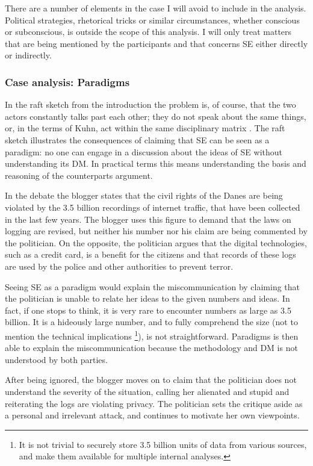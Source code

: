 \documentclass{article}
\begin{document}
There are a number of elements in the case I will avoid to include in the analysis. Political strategies, rhetorical tricks or similar circumstances, whether conscious or subconscious, is outside the scope of this analysis. I will only treat matters that are being mentioned by the participants and that concerns SE either directly or indirectly. 

\subsubsection{Case analysis: Paradigms}
In the raft sketch from the introduction the problem is, of course, that the two actors constantly talks past each other; they do not speak about the same things, or, in the terms of Kuhn, act within the same disciplinary matrix \citep{Holm:2014}. The raft sketch illustrates the consequences of claiming that SE can be seen as a paradigm: no one can engage in a discussion about the ideas of SE without understanding its DM. In practical terms this means understanding the basis and reasoning of the counterparts argument.

In the debate the blogger states that the civil rights of the Danes are being violated by the 3.5 billion recordings of internet traffic, that have been collected in the last few years. The blogger uses this figure to demand that the laws on logging are revised, but neither his number nor his claim are being commented by the politician. On the opposite, the politician argues that the digital technologies, such as a credit card, is a benefit for the citizens and that records of these logs are used by the police and other authorities to prevent terror.

Seeing SE as a paradigm would explain the miscommunication by claiming that the politician is unable to relate her ideas to the given numbers and ideas. In fact, if one stops to think, it is very rare to encounter numbers as large as 3.5 billion. It is a hideously large number, and to fully comprehend the size (not to mention the technical implications \footnote{It is not trivial to securely store 3.5 billion units of data from various sources, and make them available for multiple internal analyses.}), is not straightforward. Paradigms is then able to explain the miscommunication because the methodology and DM is not understood by both parties.
 
After being ignored, the blogger moves on to claim that the politician does not understand the severity of the situation, calling her alienated and stupid and reiterating the logs are violating privacy. The politician sets the critique aside as a personal and irrelevant attack, and continues to motivate her own viewpoints.
\end{document}
